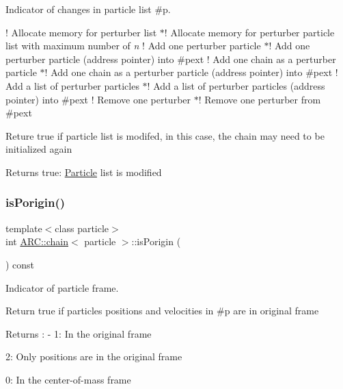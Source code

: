 Indicator of changes in particle list \#p. 

! Allocate memory for perturber list $\ast$! Allocate memory for perturber particle list with maximum number of {\itshape n} ! Add one perturber particle $\ast$! Add one perturber particle (address pointer) into \#pext ! Add one chain as a perturber particle $\ast$! Add one chain as a perturber particle (address pointer) into \#pext ! Add a list of perturber particles $\ast$! Add a list of perturber particles (address pointer) into \#pext ! Remove one perturber $\ast$! Remove one perturber from \#pext

Reture true if particle list is modifed, in this case, the chain may need to be initialized again \begin{DoxyReturn}{Returns}
true\+: \hyperlink{classParticle}{Particle} list is modified 
\end{DoxyReturn}
\hypertarget{classARC_1_1chain_afd0342ec9b20a318d811f3ec0f6c9950}{}\label{classARC_1_1chain_afd0342ec9b20a318d811f3ec0f6c9950} 
\subsubsection{\texorpdfstring{is\+Porigin()}{isPorigin()}}
{\footnotesize\ttfamily template$<$class particle$>$ \\
int \hyperlink{classARC_1_1chain}{A\+R\+C\+::chain}$<$ particle $>$\+::is\+Porigin (\begin{DoxyParamCaption}{ }\end{DoxyParamCaption}) const\hspace{0.3cm}{\ttfamily [inline]}}



Indicator of particle frame. 

Return true if particles positions and velocities in \#p are in original frame \begin{DoxyReturn}{Returns}
\+: -\/ 1\+: In the original frame
\begin{DoxyItemize}
\item 2\+: Only positions are in the original frame
\item 0\+: In the center-\/of-\/mass frame 
\end{DoxyItemize}
\end{DoxyReturn}
\hypertarget{classARC_1_1chain_a80fd78294335c1990783ec562213342b}{}\label{classARC_1_1chain_a80fd78294335c1990783ec562213342b} 
